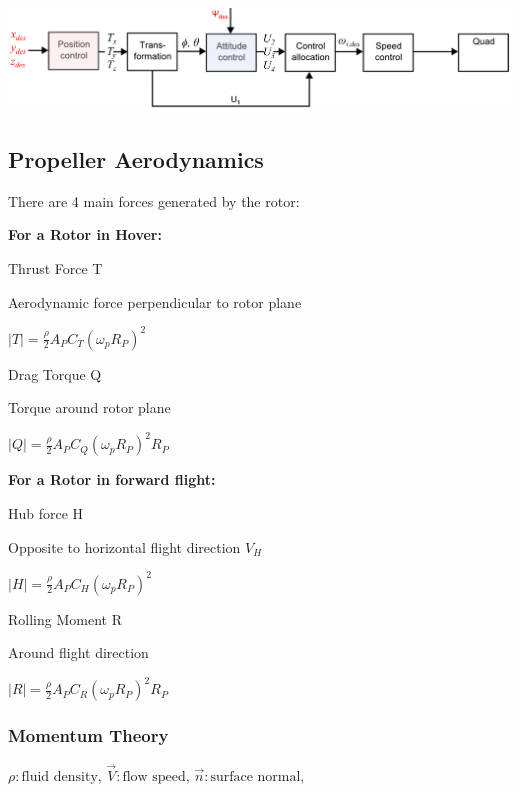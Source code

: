 \documentclass[fontsize=6pt,DIV=calc,a4paper,ngerman]{scrartcl}
\begin{document}
\begin{multicols*}{4}
	\begin{center}
		\includegraphics[width=0.9\linewidth]{control.png}\\
	\end{center}
	
	\subsection{Propeller Aerodynamics}
	There are 4 main forces generated by the rotor:

	\medskip
	\textbf{For a Rotor in Hover:}

	\smallskip
	\begin{minipage}{0.45\linewidth}
		Thrust Force T

		\smallskip
		Aerodynamic force perpendicular to rotor plane

		\smallskip
		$|T|=\frac{\rho}{2}A_PC_T(\omega_pR_P)^2$

	\end{minipage}\hfill
	\begin{minipage}{0.5\linewidth}
		Drag Torque Q

		\smallskip
		Torque around rotor plane

		\smallskip
		$|Q|=\frac{\rho}{2}A_PC_Q(\omega_pR_P)^2R_P$

	\end{minipage}

	\medskip
	\textbf{For a Rotor in forward flight:}

	\begin{minipage}{0.45\linewidth}
		Hub force H

		\smallskip
		Opposite to horizontal flight direction $V_H$

		\smallskip
		$|H|= \frac{\rho}{2}A_PC_H(\omega_pR_P)^2$
	\end{minipage}\hfill
	\begin{minipage}{0.5\linewidth}
		Rolling Moment R

		\smallskip
		Around flight direction

		\smallskip
		$|R|= \frac{\rho}{2}A_PC_R(\omega_pR_P)^2R_P$
	\end{minipage}


	\subsubsection{Momentum Theory}
	{\small
		$\rho:\text{fluid density, }\vec{V}:\text{flow speed, } \vec{n}: \text{surface normal, }$

}
\end{multicols*}
\end{document}
